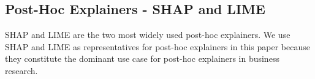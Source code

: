 \documentclass[mnsc,blindrev]{informs3}
\begin{document}
    \subsection{Post-Hoc Explainers - SHAP and LIME}
     SHAP \citep{lundberg17shap} and LIME \citep{ribeiro16lime}  are the two most widely used post-hoc explainers. %
        We use SHAP and LIME as representatives for post-hoc explainers in this paper because they constitute the dominant use case for post-hoc explainers in business research.

        
\end{document}
